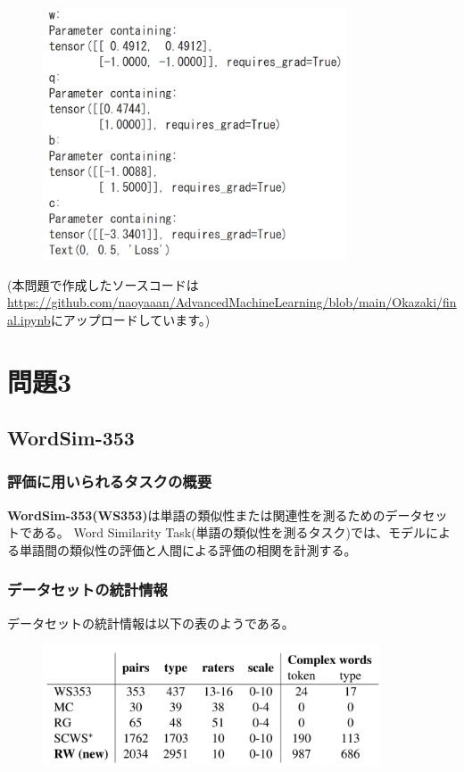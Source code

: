 \documentclass[a4j,11pt]{jarticle}
\begin{document}
\begin{figure}[hbtp]
    \centering
    \includegraphics[width=9cm]{p2-2.png}
\end{figure}

(本問題で作成したソースコードは\url{https://github.com/naoyaaan/AdvancedMachineLearning/blob/main/Okazaki/final.ipynb}にアップロードしています。)

\newpage
\section{問題3}

\subsection{WordSim-353}
\subsubsection*{評価に用いられるタスクの概要}
\textbf{WordSim-353(WS353)}は単語の類似性または関連性を測るためのデータセットである。
Word Similarity Task(単語の類似性を測るタスク)では、モデルによる単語間の類似性の評価と人間による評価の相関を計測する。

\subsubsection*{データセットの統計情報}
データセットの統計情報は以下の表\cite{Recursive NN}のようである。

\begin{figure}[hbtp]
    \centering
    \includegraphics[width=10cm]{p3-1.png}
\end{figure}
\end{document}
